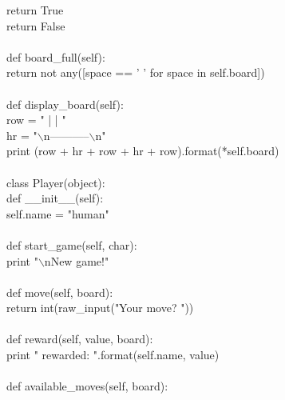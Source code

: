 \documentclass[a4paper, 12pt, notitlepage]{report}
\begin{document}
    \hspace*{16ex} return True\\
    \hspace*{8ex} return False\\
	\\
    \hspace*{4ex} def board\_full(self):\\
    \hspace*{8ex} return not any([space == ' ' for space in self.board])\\
	\\
    \hspace*{4ex} def display\_board(self):\\
    \hspace*{8ex} row = " {} | {} | {}" \\
    \hspace*{8ex} hr = "$\backslash$n-----------$\backslash$n"\\
    \hspace*{8ex} print (row + hr + row + hr + row).format(*self.board)\\
\\    
class Player(object):\\
    \hspace*{4ex} def \_\_init\_\_(self):\\
        \hspace*{8ex} self.name = "human" \\
\\
    \hspace*{4ex} def start\_game(self, char):\\
        \hspace*{8ex} print "$\backslash$nNew game!"\\
\\
    \hspace*{4ex} def move(self, board):\\
    \hspace*{8ex}     return int(raw\_input("Your move? "))\\
\\
    \hspace*{4ex} def reward(self, value, board):\\
    \hspace*{8ex}    print "{} rewarded: {}".format(self.name, value)\\
\\
    \hspace*{4ex} def available\_moves(self, board):\\
\end{document}
